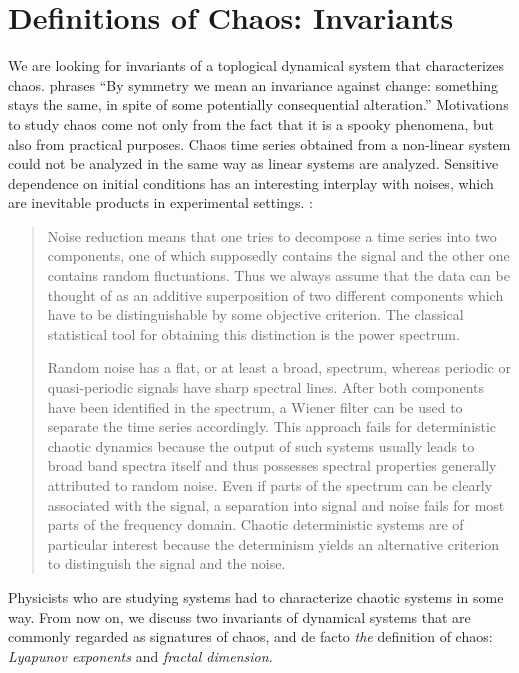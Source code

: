 \documentclass[12pt,twoside,draft]{book}
\begin{document}
\section{Definitions of Chaos: Invariants}
We are looking for invariants of a toplogical dynamical system that characterizes chaos.
\citet[p.xiii-xv]{schroeder} phrases
``By symmetry we mean an invariance against change: something stays the same, in spite of some potentially consequential alteration.''
Motivations to study chaos come not only from the fact that it is a spooky phenomena, but also from practical purposes.
Chaos time series obtained from a non-linear system could not be analyzed in the same way as linear systems are analyzed.
Sensitive dependence on initial conditions has an interesting interplay with noises, which are inevitable products in experimental settings.
\citet[p.51]{kantz-schreiber}:
\begin{quotation}
  Noise reduction means that one tries to decompose a time series into two components, one of which supposedly contains the signal and the other one contains random fluctuations.
  Thus we always assume that the data can be thought of as an additive superposition of two different components which have to be distinguishable by some objective criterion.
  The classical statistical tool for obtaining this distinction is the power spectrum.

  Random noise has a flat, or at least a broad, spectrum, whereas periodic or quasi-periodic signals have sharp spectral lines.
  After both components have been identified in the spectrum, a Wiener filter can be used to separate the time series accordingly.
  This approach fails for deterministic chaotic dynamics because the output of such systems usually leads to broad band spectra itself and thus possesses spectral properties generally attributed to random noise.
  Even if parts of the spectrum can be clearly associated with the signal, a separation into signal and noise fails for most parts of the frequency domain.
  Chaotic deterministic systems are of particular interest because the determinism yields an alternative criterion to distinguish the signal and the noise. 
\end{quotation}
Physicists who are studying systems had to characterize chaotic systems in some way.
From now on, we discuss two invariants of dynamical systems that are commonly regarded as signatures of chaos, and de facto \textit{the} definition of chaos: \textit{Lyapunov exponents} and \textit{fractal dimension}.
\end{document}
